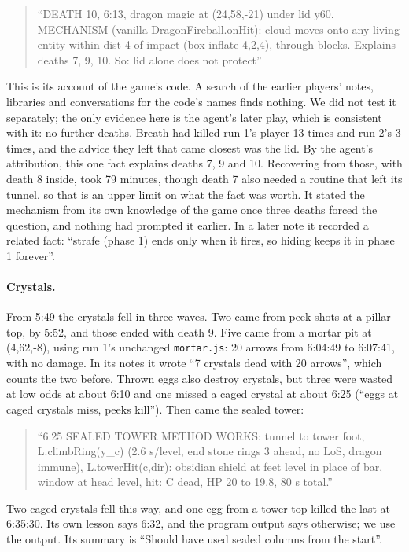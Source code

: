 \documentclass[11pt,a4paper]{article}
\begin{document}
\begin{quote}
``DEATH 10, 6:13, dragon magic at (24,58,-21) under lid y60. MECHANISM (vanilla DragonFireball.onHit): cloud moves onto any living entity within dist 4 of impact (box inflate 4,2,4), through blocks. Explains deaths 7, 9, 10. So: lid alone does not protect''
\end{quote}

This is its account of the game's code. A search of the earlier players' notes, libraries and conversations for the code's names finds nothing. We did not test it separately; the only evidence here is the agent's later play, which is consistent with it: no further deaths. Breath had killed run 1's player 13 times and run 2's 3 times, and the advice they left that came closest was the lid. By the agent's attribution, this one fact explains deaths 7, 9 and 10. Recovering from those, with death 8 inside, took 79 minutes, though death 7 also needed a routine that left its tunnel, so that is an upper limit on what the fact was worth. It stated the mechanism from its own knowledge of the game once three deaths forced the question, and nothing had prompted it earlier. In a later note it recorded a related fact: ``strafe (phase 1) ends only when it fires, so hiding keeps it in phase 1 forever''.

\paragraph{Crystals.} From 5:49 the crystals fell in three waves. Two came from peek shots at a pillar top, by 5:52, and those ended with death 9. Five came from a mortar pit at (4,62,-8), using run 1's unchanged \texttt{mortar.js}: 20 arrows from 6:04:49 to 6:07:41, with no damage. In its notes it wrote ``7 crystals dead with 20 arrows'', which counts the two before. Thrown eggs also destroy crystals, but three were wasted at low odds at about 6:10 and one missed a caged crystal at about 6:25 (``eggs at caged crystals miss, peeks kill''). Then came the sealed tower:

\begin{quote}
``6:25 SEALED TOWER METHOD WORKS: tunnel to tower foot, L.climbRing(y\_c) (2.6 s/level, end stone rings 3 ahead, no LoS, dragon immune), L.towerHit(c,dir): obsidian shield at feet level in place of bar, window at head level, hit: C dead, HP 20 to 19.8, 80 s total.''
\end{quote}

Two caged crystals fell this way, and one egg from a tower top killed the last at 6:35:30. Its own lesson says 6:32, and the program output says otherwise; we use the output. Its summary is ``Should have used sealed columns from the start''.
\end{document}
